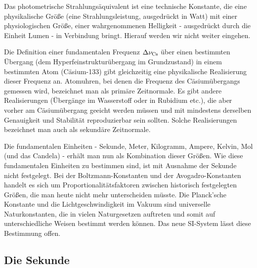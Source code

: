 Das photometrische Strahlungs\"aquivalent ist eine technische Konstante, die eine physikalische
Gr\"o\ss e (eine Strahlungsleistung, ausgedr\"uckt in Watt) mit einer physiologischen Gr\"o\ss e,
einer wahrgenommenen Helligkeit - ausgedr\"uckt durch die Einheit Lumen - in Verbindung bringt. 
Hierauf werden wir nicht weiter eingehen. 

Die Definition einer fundamentalen Frequenz $\Delta \nu_{\rm Cs}$ \"uber einen bestimmten
\"Ubergang (dem Hyperfeinstruktur\"ubergang im Grundzustand)
 in einem bestimmten Atom (C\"asium-133) gibt gleichzeitig eine physikalische Realisierung
dieser Frequenz an. Atomuhren, bei denen die Frequenz des C\"asium\"ubergangs gemessen wird, 
bezeichnet man als \glqq prim\"are Zeitnormale\grqq. 
Es gibt andere Realisierungen (\"Uberg\"ange im Wasserstoff oder in Rubidium etc.),
die aber vorher am C\"asium\"ubergang geeicht werden m\"ussen und mit mindestens derselben
Genauigkeit und Stabilit\"at reproduzierbar sein sollten. Solche Realisierungen bezeichnet man
auch als \glqq sekund\"are Zeitnormale\grqq. 

Die fundamentalen Einheiten - Sekunde, Meter, Kilogramm, Ampere, Kelvin, Mol (und das Candela) -
erh\"alt man nun als Kombination dieser Gr\"o\ss en. Wie diese fundamentalen Einheiten zu bestimmen
sind, ist mit Ausnahme der Sekunde nicht festgelegt. Bei der Boltzmann-Konstanten und der Avogadro-Konstanten
handelt es sich um Proportionalit\"atsfaktoren zwischen historisch festgelegten Gr\"o\ss en, die
man heute nicht mehr unterscheiden m\"usste. Die Planck'sche Konstante und die Lichtgeschwindigkeit
im Vakuum sind universelle Naturkonstanten, die in vielen Naturgesetzen auftreten und somit
auf unterschiedliche Weisen bestimmt werden k\"onnen. Das neue SI-System l\"asst diese
Bestimmung offen.  

\subsection{Die Sekunde}
\label{sec_Sekunde}

